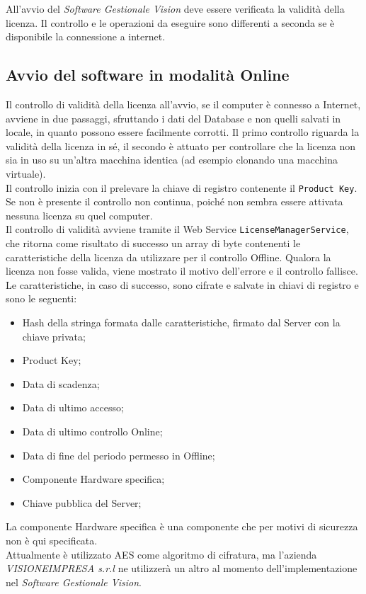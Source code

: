 All’avvio del \textit{Software Gestionale Vision} deve essere verificata la validità della licenza. Il controllo e le operazioni da eseguire sono differenti a seconda se è disponibile la connessione a internet. 

\subsection{Avvio del software in modalità Online}

Il controllo di validità della licenza all'avvio, se il computer è connesso a Internet, avviene in due passaggi, sfruttando i dati del Database e non quelli salvati in locale, in quanto possono essere facilmente corrotti. Il primo controllo riguarda la validità della licenza in sé, il secondo è attuato per controllare che la licenza non sia in uso su un'altra macchina identica (ad esempio clonando una macchina virtuale).\\
Il controllo inizia con il prelevare la chiave di registro contenente il \texttt{Product Key}. Se non è presente il controllo non continua, poiché non sembra essere attivata nessuna licenza su quel computer.\\  
Il controllo di validità avviene tramite il Web Service \texttt{LicenseManagerService}, che ritorna come risultato di successo un array di byte contenenti le caratteristiche della licenza da utilizzare per il controllo Offline. Qualora la licenza non fosse valida, viene mostrato il motivo dell’errore e il controllo fallisce.
\\Le caratteristiche, in caso di successo, sono cifrate e salvate in chiavi di registro e sono le seguenti: 
\begin{itemize}
\item Hash della stringa formata dalle caratteristiche, firmato dal Server con la chiave privata;
\item Product Key;
\item Data di scadenza;
\item Data di ultimo accesso;
\item Data di ultimo controllo Online;
\item Data di fine del periodo permesso in Offline;
\item Componente Hardware specifica;
\item Chiave pubblica del Server;
\end{itemize}

La componente Hardware specifica è una componente che per motivi di sicurezza non è qui specificata.\\
Attualmente è utilizzato \gls{AES} come algoritmo di cifratura, ma l'azienda \textit{VISIONEIMPRESA s.r.l} ne utilizzerà un altro al momento dell'implementazione nel \textit{Software Gestionale Vision}.

